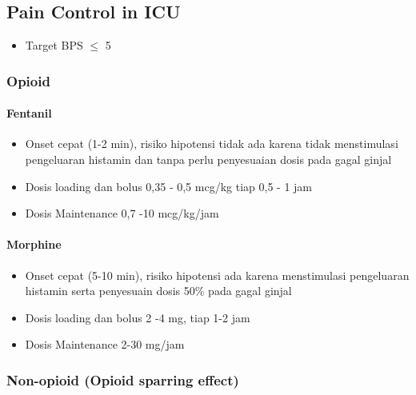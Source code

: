 \documentclass[
]{book}
\providecommand{\tightlist}{%
  \setlength{\itemsep}{0pt}\setlength{\parskip}{0pt}}
\begin{document}
\hypertarget{pain-control-in-icu}{%
\subsection{Pain Control in ICU}\label{pain-control-in-icu}}

\begin{itemize}
\tightlist
\item
  Target BPS \(\leq\) 5
\end{itemize}

\hypertarget{opioid}{%
\subsubsection{Opioid}\label{opioid}}

\hypertarget{fentanil}{%
\paragraph{Fentanil}\label{fentanil}}

\begin{itemize}
\item
  Onset cepat (1-2 min), risiko hipotensi tidak ada karena tidak menstimulasi pengeluaran histamin dan tanpa perlu penyesuaian dosis pada gagal ginjal
\item
  Dosis loading dan bolus
  0,35 - 0,5 mcg/kg tiap 0,5 - 1 jam
\item
  Dosis Maintenance
  0,7 -10 mcg/kg/jam
\end{itemize}

\hypertarget{morphine}{%
\paragraph{Morphine}\label{morphine}}

\begin{itemize}
\item
  Onset cepat (5-10 min), risiko hipotensi ada karena menstimulasi pengeluaran histamin serta penyesuain dosis 50\% pada gagal ginjal
\item
  Dosis loading dan bolus
  2 -4 mg, tiap 1-2 jam
\item
  Dosis Maintenance
  2-30 mg/jam
\end{itemize}

\hypertarget{non-opioid-opioid-sparring-effect}{%
\subsubsection{Non-opioid (Opioid sparring effect)}\label{non-opioid-opioid-sparring-effect}}
\end{document}
